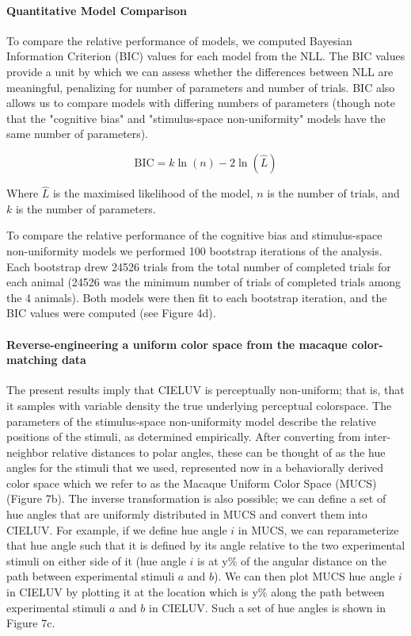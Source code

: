 \documentclass[9pt,biorxiv,lineno,onehalfspacing]{lapreprint}
\begin{document}
\begin{refsection}
\paragraph{Quantitative Model Comparison}
To compare the relative performance of models, we computed Bayesian Information Criterion (BIC) values for each model from the NLL. 
The BIC values provide a unit by which we can assess whether the differences between NLL are meaningful, penalizing for number of parameters and number of trials. 
BIC also allows us to compare models with differing numbers of parameters (though note that the "cognitive bias" and "stimulus-space non-uniformity" models have the same number of parameters).

\begin{equation}
    \text{BIC} = k\ln(n)-2\ln(\hat{L})
\end{equation}

Where $\hat{L}$ is the maximised likelihood of the model, $n$ is the number of trials, and $k$ is the number of parameters.

To compare the relative performance of the cognitive bias and stimulus-space non-uniformity models we performed 100 bootstrap iterations of the analysis. 
Each bootstrap drew 24526 trials from the total number of completed trials for each animal (24526 was the minimum number of trials of completed trials among the 4 animals). 
Both models were then fit to each bootstrap iteration, and the BIC values were computed (see Figure 4d).

\paragraph{Reverse-engineering a uniform color space from the macaque color-matching data}

The present results imply that CIELUV is perceptually non-uniform; that is, that it samples with variable density the true underlying perceptual colorspace. 
The parameters of the stimulus-space non-uniformity model describe the relative positions of the stimuli, as determined empirically. 
After converting from inter-neighbor relative distances to polar angles, these can be thought of as the hue angles for the stimuli that we used, represented now in a behaviorally derived color space which we refer to as the Macaque Uniform Color Space (MUCS) (Figure 7b). 
The inverse transformation is also possible; we can define a set of hue angles that are uniformly distributed in MUCS and convert them into CIELUV. 
For example, if we define hue angle $i$ in MUCS, we can reparameterize that hue angle such that it is defined by its angle relative to the two experimental stimuli on either side of it (hue angle $i$ is at y\% of the angular distance on the path between experimental stimuli $a$ and $b$). 
We can then plot MUCS hue angle $i$ in CIELUV by plotting it at the location which is y\% along the path between experimental stimuli $a$ and $b$ in CIELUV. 
Such a set of hue angles is shown in Figure 7c. 


\end{refsection}
\end{document}
